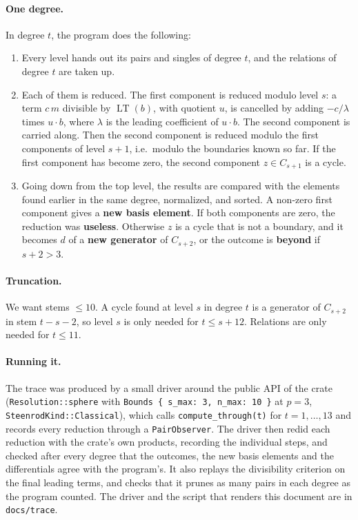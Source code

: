 \documentclass[11pt]{article}
\DeclareMathOperator{\LT}{LT}
\begin{document}
\paragraph{One degree.}
In degree $t$, the program does the following:
\begin{enumerate}
\item Every level hands out its pairs and singles of degree $t$, and the relations of degree
  $t$ are taken up.
\item Each of them is reduced. The first component is reduced modulo level $s$: a term
  $c\,m$ divisible by $\LT(b)$, with quotient $u$, is cancelled by adding $-c/\lambda$ times
  $u \cdot b$, where $\lambda$ is the leading coefficient of $u \cdot b$. The second component
  is carried along. Then the second component is reduced modulo the first components of level
  $s+1$, i.e.\ modulo the boundaries known so far. If the first component has become zero, the
  second component $z \in C_{s+1}$ is a cycle.
\item Going down from the top level, the results are compared with the elements found earlier
  in the same degree, normalized, and sorted. A non-zero first component gives a \textbf{new
  basis element}. If both components are zero, the reduction was \textbf{useless}. Otherwise
  $z$ is a cycle that is not a boundary, and it becomes $d$ of a \textbf{new generator} of
  $C_{s+2}$, or the outcome is \textbf{beyond} if $s + 2 > 3$.
\end{enumerate}

\paragraph{Truncation.}
We want stems $\le 10$. A cycle found at level $s$ in degree $t$ is a generator of $C_{s+2}$ in
stem $t-s-2$, so level $s$ is only needed for $t \le s + 12$. Relations are only needed for
$t \le 11$.

\paragraph{Running it.}\sloppy
The trace was produced by a small driver around the public API of the crate (\texttt{Resolution::sphere} with \texttt{Bounds \{ s\_max: 3, n\_max: 10 \}} at $p = 3$, \texttt{SteenrodKind::Classical}), which calls \texttt{compute\_through(t)} for $t = 1, \dots, 13$ and records every reduction through a \texttt{PairObserver}. The driver then redid each reduction with the crate's own products, recording the individual steps, and checked after every degree that the outcomes, the new basis elements and the differentials agree with the program's. It also replays the divisibility criterion on the final leading terms, and checks that it prunes as many pairs in each degree as the program counted. The driver and the script that renders this document are in \texttt{docs/trace}.
\end{document}
